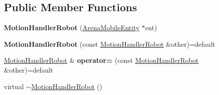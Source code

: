 \subsection*{Public Member Functions}
\begin{DoxyCompactItemize}
\item 
{\bfseries Motion\+Handler\+Robot} (\hyperlink{classArenaMobileEntity}{Arena\+Mobile\+Entity} $\ast$ent)\hypertarget{classMotionHandlerRobot_a4b52a0b181837a8d63c39f71811d691b}{}\label{classMotionHandlerRobot_a4b52a0b181837a8d63c39f71811d691b}

\item 
{\bfseries Motion\+Handler\+Robot} (const \hyperlink{classMotionHandlerRobot}{Motion\+Handler\+Robot} \&other)=default\hypertarget{classMotionHandlerRobot_a66445cc9057e3ef9298b5bd239df6d4e}{}\label{classMotionHandlerRobot_a66445cc9057e3ef9298b5bd239df6d4e}

\item 
\hyperlink{classMotionHandlerRobot}{Motion\+Handler\+Robot} \& {\bfseries operator=} (const \hyperlink{classMotionHandlerRobot}{Motion\+Handler\+Robot} \&other)=default\hypertarget{classMotionHandlerRobot_a48181f197ffb864f16e29721ad964e4a}{}\label{classMotionHandlerRobot_a48181f197ffb864f16e29721ad964e4a}

\item 
virtual \hyperlink{classMotionHandlerRobot_adec3a23a4b5cf27331674b32a967ced9}{$\sim$\+Motion\+Handler\+Robot} ()\hypertarget{classMotionHandlerRobot_adec3a23a4b5cf27331674b32a967ced9}{}\label{classMotionHandlerRobot_adec3a23a4b5cf27331674b32a967ced9}


\end{DoxyCompactItemize}
